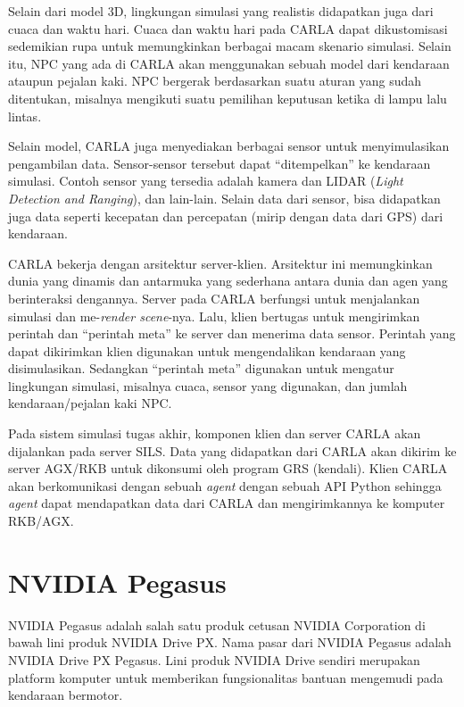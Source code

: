Selain dari model 3D, lingkungan simulasi yang realistis didapatkan juga dari
cuaca dan waktu hari. Cuaca dan waktu hari pada CARLA dapat dikustomisasi
se\-de\-mi\-ki\-an rupa untuk memungkinkan berbagai macam skenario simulasi.
Selain itu, NPC yang ada di CARLA akan menggunakan sebuah model dari kendaraan
ataupun pejalan kaki. NPC bergerak berdasarkan suatu aturan yang sudah
ditentukan, misalnya mengikuti suatu pemilihan keputusan ketika di lampu lalu
lintas.

Selain model, CARLA juga menyediakan berbagai sensor untuk menyimulasikan
pengambilan data. Sensor-sensor tersebut dapat ``ditempelkan'' ke kendaraan
simulasi. Contoh sensor yang tersedia adalah kamera dan LIDAR (\textit{Light
    Detection and Ranging}), dan lain-lain. Selain data dari sensor, bisa didapatkan
juga data seperti kecepatan dan percepatan (mirip dengan data dari GPS) dari
kendaraan.

CARLA bekerja dengan arsitektur server-klien. Arsitektur ini memungkinkan dunia
yang dinamis dan antarmuka yang sederhana antara dunia dan agen yang
berinteraksi dengannya. Server pada CARLA berfungsi untuk menjalankan simulasi
dan me-\textit{render scene}-nya. Lalu, klien bertugas untuk mengirimkan
perintah dan ``perintah meta'' ke server dan menerima data sensor. Perintah yang
dapat dikirimkan klien digunakan untuk mengendalikan kendaraan yang
disimulasikan. Sedangkan ``perintah meta'' digunakan untuk mengatur lingkungan
simulasi, misalnya cuaca, sensor yang digunakan, dan jumlah kendaraan/pejalan
kaki NPC.

Pada sistem simulasi tugas akhir, komponen klien dan server CARLA akan
dijalankan pada server SILS. Data yang didapatkan dari CARLA akan dikirim ke
server AGX/RKB untuk dikonsumi oleh program GRS (kendali). Klien CARLA akan
berkomunikasi dengan sebuah \textit{agent} dengan sebuah API Python sehingga
\textit{agent} dapat mendapatkan data dari CARLA dan mengirimkannya ke komputer
RKB/AGX.

\section{NVIDIA Pegasus}

NVIDIA Pegasus adalah salah satu produk cetusan NVIDIA Corporation di bawah lini
produk NVIDIA Drive PX. Nama pasar dari NVIDIA Pegasus adalah N\-VI\-DI\-A Drive
PX Pegasus. Lini produk NVIDIA Drive sendiri merupakan platform komputer untuk
memberikan fungsionalitas bantuan mengemudi pada kendaraan bermotor.

